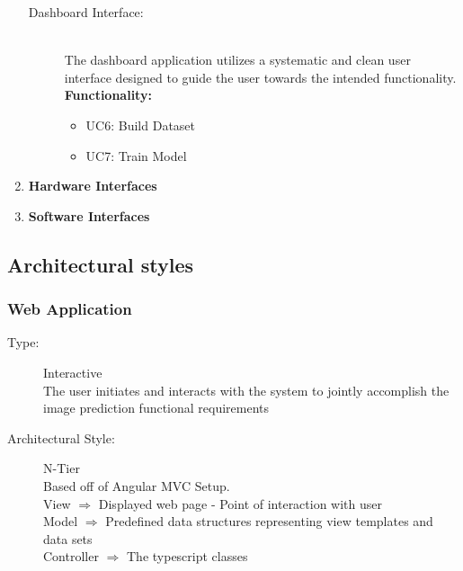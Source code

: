 \documentclass[a4paper, 11pt]{article}
\begin{document}
\begin{enumerate}
\begin{description}
    \item[Dashboard Interface:] \hfill \\
      The dashboard application utilizes a systematic and clean user interface designed to guide the user towards the intended functionality. \\ 
      \textbf{Functionality:}
      \begin{itemize}
          \item UC6: Build Dataset
          \item UC7: Train Model
      \end{itemize}
\end{description}
\item \textbf{Hardware Interfaces}
\item \textbf{Software Interfaces}
\end{enumerate}

\subsection{Architectural styles}

\subsubsection{Web Application}
\begin{description}
  \item[Type:] Interactive \\
  The user initiates and interacts with the system to jointly accomplish the image prediction functional requirements
  \item[Architectural Style:] N-Tier \\
  Based off of Angular MVC Setup. \\
  View $\Rightarrow$ Displayed web page - Point of interaction with user \\
  Model $\Rightarrow$ Predefined data structures representing view templates and data sets \\
  Controller $\Rightarrow$ The typescript classes
\end{description}
\end{document}
